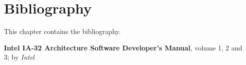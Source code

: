 
%
%

\chapter{Bibliography}

This chapter contains the bibliography.

%
%

\begin{thebibliography}{0}
    \textbf{Intel IA-32 Architecture Software Developer's Manual}, volume 1,
    2 and 3;
    by
    \textit{Intel}
\end{thebibliography}
